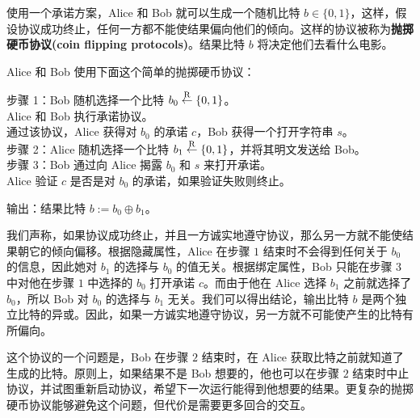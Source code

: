 \begin{snote}[抛掷硬币。]
使用一个承诺方案，Alice 和 Bob 就可以生成一个随机比特 $b\in\{0,1\}$，这样，假设协议成功终止，任何一方都不能使结果偏向他们的倾向。这样的协议被称为\textbf{抛掷硬币协议(coin flipping protocols)}。结果比特 $b$ 将决定他们去看什么电影。

Alice 和 Bob 使用下面这个简单的抛掷硬币协议：

\vspace*{5pt}

\hspace*{5pt} 步骤 1：Bob 随机选择一个比特 $b_0\overset{\rm R}\leftarrow\{0,1\}$。\\
\hspace*{50pt} Alice 和 Bob 执行承诺协议。\\
\hspace*{50pt} 通过该协议，Alice 获得对 $b_0$ 的承诺 $c$，Bob 获得一个打开字符串 $s$。\\
\hspace*{26pt} 步骤 2：Alice 随机选择一个比特 $b_1\overset{\rm R}\leftarrow\{0,1\}$，并将其明文发送给 Bob。\\
\hspace*{26pt} 步骤 3：Bob 通过向 Alice 揭露 $b_0$ 和 $s$ 来打开承诺。\\
\hspace*{50pt} Alice 验证 $c$ 是否是对 $b_0$ 的承诺，如果验证失败则终止。

\vspace*{3pt}

\hspace*{5pt} 输出：结果比特 $b:=b_0\oplus b_1$。

\vspace*{5pt}

\noindent
我们声称，如果协议成功终止，并且一方诚实地遵守协议，那么另一方就不能使结果朝它的倾向偏移。根据隐藏属性，Alice 在步骤 $1$ 结束时不会得到任何关于 $b_0$ 的信息，因此她对 $b_1$ 的选择与 $b_0$ 的值无关。根据绑定属性，Bob 只能在步骤 $3$ 中对他在步骤 $1$ 中选择的 $b_0$ 打开承诺 $c$。而由于他在 Alice 选择 $b_1$ 之前就选择了 $b_0$，所以 Bob 对 $b_0$ 的选择与 $b_1$ 无关。我们可以得出结论，输出比特 $b$ 是两个独立比特的异或。因此，如果一方诚实地遵守协议，另一方就不可能使产生的比特有所偏向。

这个协议的一个问题是，Bob 在步骤 $2$ 结束时，在 Alice 获取比特之前就知道了生成的比特。原则上，如果结果不是 Bob 想要的，他也可以在步骤 $2$ 结束时中止协议，并试图重新启动协议，希望下一次运行能得到他想要的结果。更复杂的抛掷硬币协议能够避免这个问题，但代价是需要更多回合的交互。
\end{snote}

